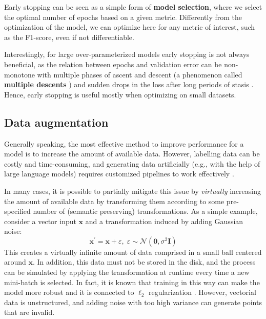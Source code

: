 Early stopping can be seen as a simple form of \textbf{model selection}, where we select the optimal number of epochs based on a given metric. Differently from the optimization of the model, we can optimize here for any metric of interest, such as the F1-score, even if not differentiable. 

Interestingly, for large over-parameterized models early stopping is not always beneficial, as the relation between epochs and validation error can be non-monotone with multiple phases of ascent and descent (a phenomenon called \textbf{multiple descents} \cite{rocks2022memorizing}) and sudden drops in the loss after long periods of stasis \cite{power2022grokking}. Hence, early stopping is useful mostly when optimizing on small datasets.

\subsection{Data augmentation} \addclock

Generally speaking, the most effective method to improve performance for a model is to increase the amount of available data. However, labelling data can be costly and time-consuming, and generating data artificially (e.g., with the help of large language models) requires customized pipelines to work effectively \cite{patel2024datadreamer}.

In many cases, it is possible to partially mitigate this issue by \textit{virtually} increasing the amount of available data by transforming them according to some pre-specified number of (semantic preserving) transformations. As a simple example, consider a vector input $\mathbf{x}$ and a transformation induced by adding Gaussian noise:
%
$$
\mathbf{x}^\prime=\mathbf{x}+\varepsilon,\;\varepsilon \sim \mathcal{N}(\mathbf{0},\sigma^2\mathbf{I})
$$
%
This creates a virtually infinite amount of data comprised in a small ball centered around $\mathbf{x}$. In addition, this data must not be stored in the disk, and the process can be simulated by applying the transformation at runtime every time a new mini-batch is selected. In fact, it is known that training in this way can make the model more robust and it is connected to $\ell_2$ regularization \cite{bishop1995training}. However, vectorial data is unstructured, and adding noise with too high variance can generate points that are invalid.

